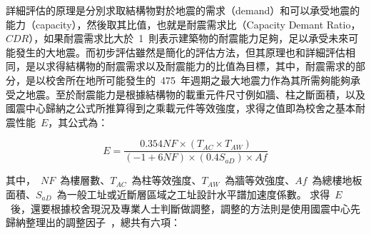 詳細評估的原理是分別求取結構物對於地震的需求（demand）和可以承受地震的能力（capacity），然後取其比值，也就是耐震需求比（Capacity Demant Ratio，$CDR$），如果耐震需求比大於~1~則表示建築物的耐震能力足夠，足以承受未來可能發生的大地震。而初步評估雖然是簡化的評估方法，但其原理也和詳細評估相同，是以求得結構物的耐震需求以及耐震能力的比值為目標，其中，耐震需求的部分，是以校舍所在地所可能發生的~475~年週期之最大地震力作為其所需夠能夠承受之地震。至於耐震能力是根據結構物的載重元件尺寸例如牆、柱之斷面積，以及國震中心歸納之公式所推算得到之乘載元件等效強度，求得之值即為校舍之基本耐震性能~$E$，其公式為：

  \begin{equation}E = \dfrac{ 0.354 NF \times (T_{AC} \times T_{AW}) }{(-1 + 6 NF) \times (0.4 S_{aD}) \times Af} \end{equation} 

其中，~$NF$~為樓層數、$T_{AC}$~為柱等效強度、$T_{AW}$~為牆等效強度、$Af$~為總樓地板面積、$S_{aD}$~為一般工址或近斷層區域之工址設計水平譜加速度係數。
求得~$E$~後，還要根據校舍現況及專業人士判斷做調整，調整的方法則是使用國震中心先歸納整理出的調整因子~\cite{ncree03049}，總共有六項：

